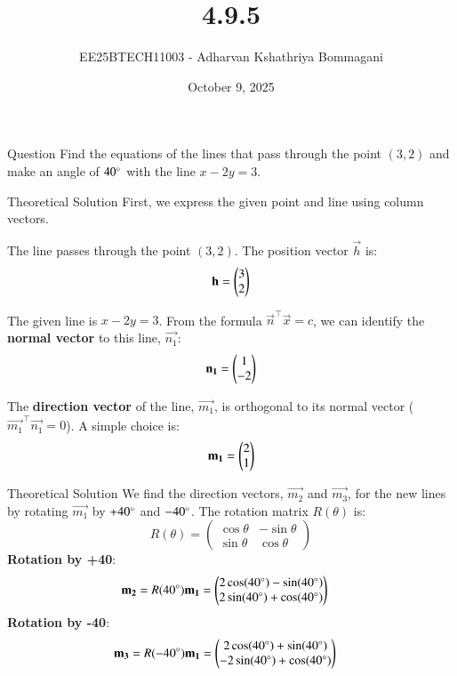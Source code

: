 \documentclass{beamer}
\title{4.9.5}
\date{October 9, 2025}
\author{EE25BTECH11003 - Adharvan Kshathriya Bommagani}
\begin{document}
\frame{\titlepage}

\begin{frame}{Question}
Find the equations of the lines that pass through the point $(3,2)$ and make an angle of $40\degree$ with the line $x - 2y = 3$.
\end{frame}

\begin{frame}{Theoretical Solution}
First, we express the given point and line using column vectors.
\bigskip

The line passes through the point $(3, 2)$. The position vector $\vec{h}$ is:
$$ \mathbf{h} = \begin{pmatrix}3 \\ 2\end{pmatrix} $$
\bigskip

The given line is $x - 2y = 3$. From the formula $\vec{n}^\top \vec{x} = c$, we can identify the \textbf{normal vector} to this line, $\vec{n_1}$:
$$ \mathbf{n_1} = \begin{pmatrix}1 \\ -2\end{pmatrix} $$
\bigskip

The \textbf{direction vector} of the line, $\vec{m_1}$, is orthogonal to its normal vector ($\vec{m_1}^\top \vec{n_1} = 0$). A simple choice is:
$$ \mathbf{m_1} = \begin{pmatrix}2 \\ 1\end{pmatrix} $$
\end{frame}

\begin{frame}{Theoretical Solution}
We find the direction vectors, $\vec{m_2}$ and $\vec{m_3}$, for the new lines by rotating $\vec{m_1}$ by $+40\degree$ and $-40\degree$.
\bigskip
The rotation matrix $R(\theta)$ is:
$$ R(\theta) = \begin{pmatrix} \cos\theta & -\sin\theta \\ \sin\theta & \cos\theta \end{pmatrix} $$
\bigskip
\textbf{Rotation by +40\degree}:
\begin{align*}
\mathbf{m_2} = R(40\degree) \mathbf{m_1} &= \begin{pmatrix}2\cos(40\degree) - \sin(40\degree) \\ 2\sin(40\degree) + \cos(40\degree)\end{pmatrix}
\end{align*}
\textbf{Rotation by -40\degree}:
\begin{align*}
\mathbf{m_3} = R(-40\degree) \mathbf{m_1} &= \begin{pmatrix}2\cos(40\degree) + \sin(40\degree) \\ -2\sin(40\degree) + \cos(40\degree)\end{pmatrix}
\end{align*}
\end{frame}
\end{document}
